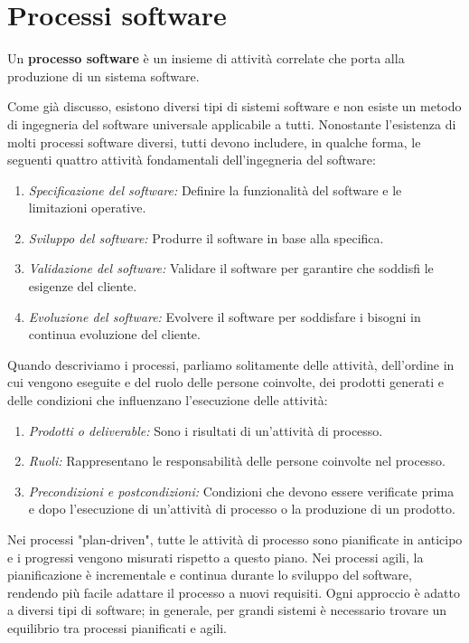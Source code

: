 \chapter{Processi software}
\begin{redbar}
Un \textbf{processo software} è un insieme di attività correlate che porta alla produzione di un sistema software.    
\end{redbar}

Come già discusso, esistono diversi tipi di sistemi software e non esiste un metodo di ingegneria del software universale applicabile a tutti. Nonostante l'esistenza di molti processi software diversi, tutti devono includere, in qualche forma, le seguenti quattro attività fondamentali dell'ingegneria del software:
\begin{enumerate}
    \item \textit{Specificazione del software:} Definire la funzionalità del software e le limitazioni operative.
    \item \textit{Sviluppo del software:} Produrre il software in base alla specifica.
    \item \textit{Validazione del software:} Validare il software per garantire che soddisfi le esigenze del cliente.
    \item \textit{Evoluzione del software:} Evolvere il software per soddisfare i bisogni in continua evoluzione del cliente.
\end{enumerate}
Quando descriviamo i processi, parliamo solitamente delle attività, dell'ordine in cui vengono eseguite e del ruolo delle persone coinvolte, dei prodotti generati e delle condizioni che influenzano l'esecuzione delle attività:
\begin{enumerate}
    \item \textit{Prodotti o deliverable:} Sono i risultati di un'attività di processo.
    \item \textit{Ruoli:} Rappresentano le responsabilità delle persone coinvolte nel processo.
    \item \textit{Precondizioni e postcondizioni:} Condizioni che devono essere verificate prima e dopo    l'esecuzione di un'attività di processo o la produzione di un prodotto.
\end{enumerate}
Nei processi "plan-driven", tutte le attività di processo sono pianificate in anticipo e i progressi vengono misurati rispetto a questo piano. Nei processi agili, la pianificazione è incrementale e continua durante lo sviluppo del software, rendendo più facile adattare il processo a nuovi requisiti. Ogni approccio è adatto a diversi tipi di software; in generale, per grandi sistemi è necessario trovare un equilibrio tra processi pianificati e agili.

